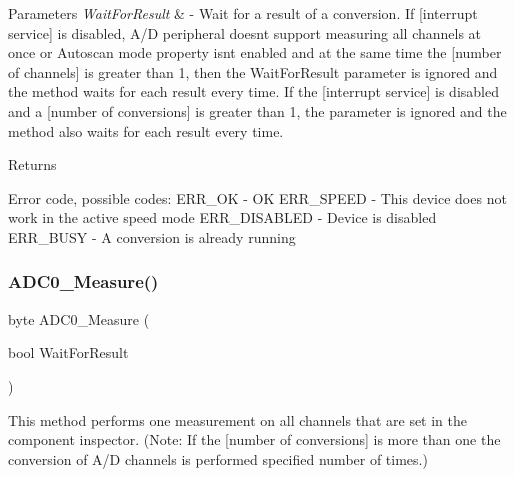 \begin{DoxyParams}{Parameters}
{\em Wait\+For\+Result} & -\/ Wait for a result of a conversion. If \mbox{[}interrupt service\mbox{]} is disabled, A/D peripheral doesn\textquotesingle{}t support measuring all channels at once or Autoscan mode property isn\textquotesingle{}t enabled and at the same time the \mbox{[}number of channels\mbox{]} is greater than 1, then the Wait\+For\+Result parameter is ignored and the method waits for each result every time. If the \mbox{[}interrupt service\mbox{]} is disabled and a \mbox{[}number of conversions\mbox{]} is greater than 1, the parameter is ignored and the method also waits for each result every time. \\
\hline
\end{DoxyParams}
\begin{DoxyReturn}{Returns}

\begin{DoxyItemize}
\item Error code, possible codes\+: E\+R\+R\+\_\+\+OK -\/ OK E\+R\+R\+\_\+\+S\+P\+E\+ED -\/ This device does not work in the active speed mode E\+R\+R\+\_\+\+D\+I\+S\+A\+B\+L\+ED -\/ Device is disabled E\+R\+R\+\_\+\+B\+U\+SY -\/ A conversion is already running 
\end{DoxyItemize}
\end{DoxyReturn}
\mbox{\label{group___a_d_c0__module_ga711a227f91b11ab087311d7a4f596323}} 
\subsubsection{\texorpdfstring{A\+D\+C0\+\_\+\+Measure()}{ADC0\_Measure()}}
{\footnotesize\ttfamily byte A\+D\+C0\+\_\+\+Measure (\begin{DoxyParamCaption}\item[{bool}]{Wait\+For\+Result }\end{DoxyParamCaption})}



This method performs one measurement on all channels that are set in the component inspector. (Note\+: If the \mbox{[}number of conversions\mbox{]} is more than one the conversion of A/D channels is performed specified number of times.) 


